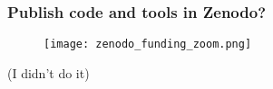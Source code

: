 \begin{frame}
\frametitle{Publish code and tools in Zenodo?}

\begin{figure}
\texttt{[image: zenodo\_funding\_zoom.png]}
\end{figure}

(I didn't do it)
\end{frame}



